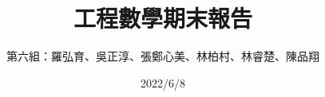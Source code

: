 \documentclass[14pt, a4paper]{article}
\title{工程數學期末報告}
\author{第六組：羅弘育、吳正淳、張鄭心美、林柏村、林睿楚、陳品翔}
\date{2022/6/8}
\makeatletter
\newcommand{\leqnomode}{\tagsleft@true}
\makeatother
\begin{document}
	\maketitle
	
	\leqnomode
	\renewcommand{\contentsname}{目錄}
    \vspace*{\fill}
	
    \vspace*{\fill}
    \tableofcontents
    \newpage

    
    
    
    
\end{document}
